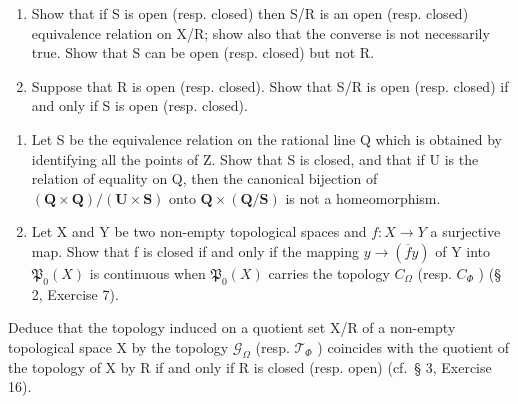 \begin{enumerate}
\def\labelenumi{\alph{enumi})}
\tightlist
\item
  Show that if S is open (resp. closed) then S/R is an open (resp. closed) equivalence relation on X/R; show also that the converse is not necessarily true. Show that S can be open (resp. closed) but not R.
\item
  Suppose that R is open (resp. closed). Show that S/R is open (resp. closed) if and only if S is open (resp. closed).
\end{enumerate}

\begin{enumerate}
\def\labelenumi{\arabic{enumi})}
\setcounter{enumi}{5}
\item
  Let S be the equivalence relation on the rational line Q which is obtained by identifying all the points of Z. Show that S is closed, and that if U is the relation of equality on Q, then the canonical bijection of \((\mathbf{Q} \times \mathbf{Q}) / (\mathbf{U} \times \mathbf{S})\) onto \(\mathbf{Q} \times (\mathbf{Q}/\mathbf{S})\) is not a homeomorphism.
\item
  Let X and Y be two non-empty topological spaces and \(f: X \to Y\) a surjective map. Show that f is closed if and only if the mapping \(y \to (\overline{f} y)\) of Y into \(\mathfrak{P}_{0}(X)\) is continuous when \(\mathfrak{P}_{0}(X)\) carries the topology \(C_{\Omega}\) (resp. \(C_{\Phi}\) ) (§ 2, Exercise 7).
\end{enumerate}

Deduce that the topology induced on a quotient set X/R of a non-empty topological space X by the topology \(\mathcal{G}_{\Omega}\) (resp. \(\mathcal{T}_{\Phi}\) ) coincides with the quotient of the topology of X by R if and only if R is closed (resp. open) (cf.~§ 3, Exercise 16).

\BourbakiExerciseGroup

